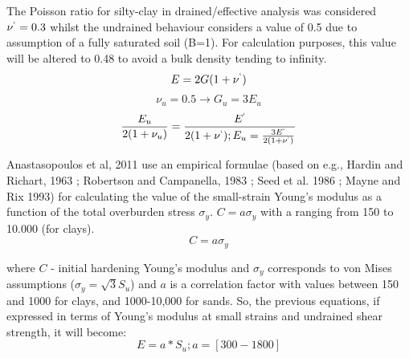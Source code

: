 \documentclass[12pt,a4paper]{report}
\begin{document}
The Poisson ratio for silty-clay in drained/effective analysis was considered $\nu^`=0.3$ whilst the undrained behaviour considers a value of 0.5 due to assumption of a fully saturated soil (B=1). For calculation purposes, this value will be altered to 0.48 to avoid a bulk density tending to infinity. 
\begin{equation}
	E=2G(1+\nu^`)
\end{equation}
\begin{equation}
	\nu_u=0.5\longrightarrow G_u=3E_u
\end{equation}
\begin{equation}
	\frac{E_u}{2(1+\nu_u)}=\frac{E^`}{2(1+\nu^`); E_u=\frac{3E^`}{2(1+\nu^`)}}
\end{equation}

Anastasopoulos et al, 2011 \cite{anastasopoulos2011simplified} use an empirical formulae (based on e.g., Hardin and Richart, 1963 \cite{hardin1963elastic}; Robertson and Campanella, 1983 \cite{robertson1983interpretation}; Seed et al. 1986 \cite{seed1986use}; Mayne and Rix 1993) for calculating the value of the small-strain Young's modulus as a function of the total overburden stress $\sigma_y$. $C=a{\sigma }_{y}$ with a ranging from 150 to 10.000 (for clays). 
\begin{equation}
	C=a\sigma_y
\end{equation} 

where $C$ - initial hardening Young's modulus and $\sigma_y$ corresponds to von Mises assumptions ($\sigma_y=\sqrt3 S_u$) and $a$ is a correlation factor with values between 150 and 1000 for clays, and 1000-10,000 for sands. So, the previous equations, if expressed in terms of Young's modulus at small strains and undrained shear strength, it will become:
\begin{equation}
	E=a*S_u;   a=[300-1800]
\end{equation}
\end{document}
